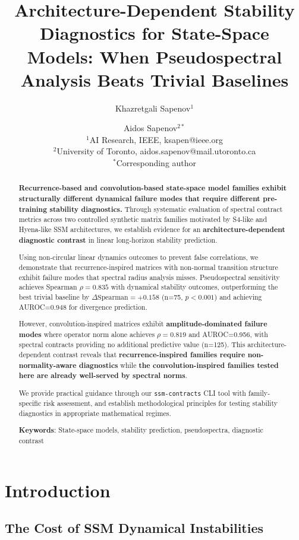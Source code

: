 \documentclass[twoside]{article}
\title{Architecture-Dependent Stability Diagnostics for State-Space Models: When Pseudospectral Analysis Beats Trivial Baselines}
\author{Khazretgali Sapenov$^1$ \and Aidos Sapenov$^{2*}$\\
\vspace{0.3em}
{\small $^1$AI Research, IEEE, ksapen@ieee.org}\\
{\small $^2$University of Toronto, aidos.sapenov@mail.utoronto.ca}\\
{\small $^*$Corresponding author}}
\begin{document}
\maketitle

\begin{abstract}
\textbf{Recurrence-based and convolution-based state-space model families exhibit structurally different dynamical failure modes that require different pre-training stability diagnostics.} Through systematic evaluation of spectral contract metrics across two controlled synthetic matrix families motivated by S4-like and Hyena-like SSM architectures, we establish evidence for an \textbf{architecture-dependent diagnostic contrast} in linear long-horizon stability prediction.

Using non-circular linear dynamics outcomes to prevent false correlations, we demonstrate that recurrence-inspired matrices with non-normal transition structure exhibit failure modes that spectral radius analysis misses. Pseudospectral sensitivity achieves Spearman $\rho=0.835$ with dynamical stability outcomes, outperforming the best trivial baseline by $\Delta\text{Spearman}=+0.158$ (n=75, $p<0.001$) and achieving AUROC=0.948 for divergence prediction.

However, convolution-inspired matrices exhibit \textbf{amplitude-dominated failure modes} where operator norm alone achieves $\rho=0.819$ and AUROC=0.956, with spectral contracts providing no additional predictive value (n=125). This architecture-dependent contrast reveals that \textbf{recurrence-inspired families require non-normality-aware diagnostics} while \textbf{the convolution-inspired families tested here are already well-served by spectral norms}.

We provide practical guidance through our \texttt{ssm-contracts} CLI tool with family-specific risk assessment, and establish methodological principles for testing stability diagnostics in appropriate mathematical regimes.

\textbf{Keywords}: State-space models, stability prediction, pseudospectra, diagnostic contrast
\end{abstract}

\section{Introduction}

\subsection{The Cost of SSM Dynamical Instabilities}
\end{document}
